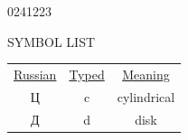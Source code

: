 \begin{scanpage}{0241}{223}
\begin{center}SYMBOL LIST\end{center}
\vspace{.6cm}
\noindent\begin{tabular*}{\linewidth}{@{\extracolsep{\fill}}ccc@{}}
\underline{Russian}&\underline{Typed}&\underline{Meaning}\\[16pt]
{\cyrillicfont Ц}&c&cylindrical\\[16pt]
{\cyrillicfont Д}&d&disk
\end{tabular*}
\end{scanpage}
